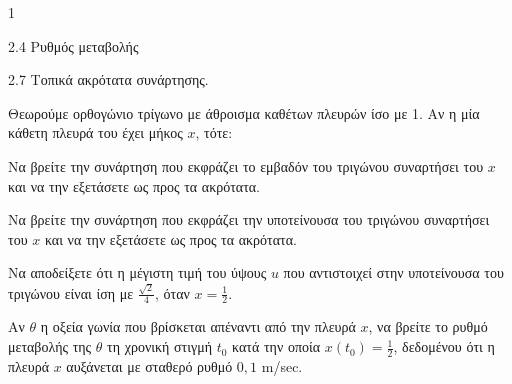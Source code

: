 \begin{ylh}{1}
    \item 2.4 Ρυθμός μεταβολής
    \item 2.7 Τοπικά ακρότατα συνάρτησης.
\end{ylh}
Θεωρούμε ορθογώνιο τρίγωνο με άθροισμα καθέτων πλευρών ίσο με 1. Αν η μία κάθετη πλευρά του έχει μήκος $x$, τότε:
\begin{alist}
\item Να βρείτε την συνάρτηση που εκφράζει το εμβαδόν του τριγώνου συναρτήσει του $x$ και να την εξετάσετε ως προς τα ακρότατα.  
\item Να βρείτε την συνάρτηση που εκφράζει την υποτείνουσα του τριγώνου συναρτήσει του $x$ και να την εξετάσετε ως προς τα ακρότατα.  
\item Να αποδείξετε ότι η μέγιστη τιμή του ύψους $u$ που αντιστοιχεί στην υποτείνουσα του τριγώνου είναι ίση με $\frac{\sqrt{2}}{4}$, όταν $x = \frac{1}{2}$.  
\item Αν $\theta$ η οξεία γωνία που βρίσκεται απέναντι από την πλευρά $x$, να βρείτε το ρυθμό μεταβολής της $\theta$ τη χρονική στιγμή $t_0$ κατά την οποία $x(t_0) = \frac{1}{2}$, δεδομένου ότι η πλευρά $x$ αυξάνεται με σταθερό ρυθμό $0,1$ m/sec.  
\end{alist}